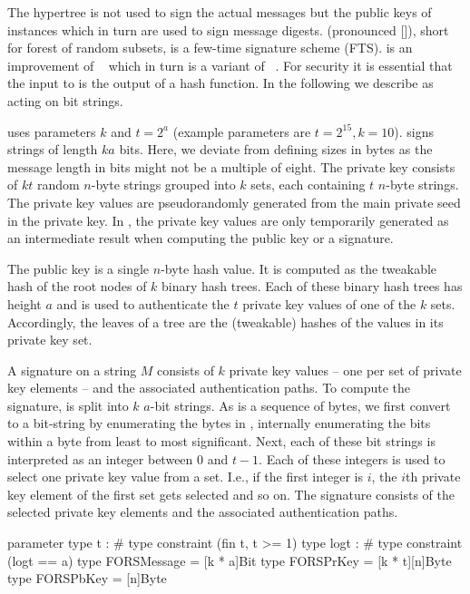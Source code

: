 The \spx hypertree \hyper is not used to sign the actual messages but the 
public keys of \fors instances which in turn are used to sign message digests. 
\fors (pronounced []), short for forest of random subsets, is a few-time 
signature scheme (FTS). \fors is an improvement of \horst~\cite{Bernstein2015} 
which in turn is a variant of \hors~\cite{Reyzin2002}. 
For security it is essential that the input to \fors is the output of a
hash function. In the following we describe \fors as acting on bit strings.


\fors uses parameters $k$ and $t=2^a$ (example parameters are $t=2^{15}, k=10$). 
\fors signs strings of length $ka$ bits. Here, we deviate from defining 
sizes in bytes as the message length in bits might not be a multiple of eight.
The private key consists of $kt$ 
random $n$-byte strings grouped
into $k$ sets, each containing $t$ $n$-byte strings. The private key values
are pseudorandomly generated from the main private seed \sseed in the \spx private
key. In \spx, the \fors private key values are only temporarily generated as an 
intermediate result when computing the public key or a signature. 

The \fors public key is a single $n$-byte hash value. It is computed as the 
tweakable hash of the root nodes of $k$ binary hash trees. Each of these binary 
hash trees has height $a$ and is used to authenticate the $t$ private key
values of one of the $k$ sets. Accordingly, the leaves of a tree are the 
(tweakable) hashes of the values in its private key set.

A signature on a string $M$ consists of $k$ private key values -- one per 
set of private key elements -- and the 
associated authentication paths. To compute the signature, \md is 
split into $k$ $a$-bit strings. As \md is a sequence of bytes,
we first convert to a bit-string by enumerating the bytes in \md,
internally enumerating the bits within a byte from least to most significant.
Next, each of these bit strings is 
interpreted as an integer between $0$ and $t-1$. Each of these integers is used to
select one private key value from a set. I.e., if the first integer is $i$, the
$i$th private key element of the first set gets selected and so on. The signature
consists of the selected private key elements and the associated authentication 
paths.

\begin{code}
  parameter
    type t : #
    type constraint (fin t, t >= 1)
    type logt : #
    type constraint (logt == a)
    type FORSMessage = [k * a]Bit
    type FORSPrKey = [k * t][n]Byte
    type FORSPbKey = [n]Byte
\end{code}

